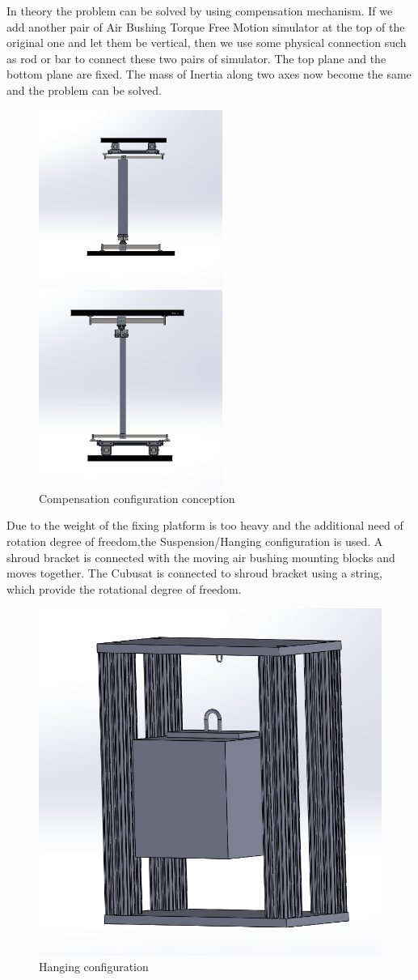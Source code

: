 In theory the problem can be solved by using compensation mechanism. If we add another pair of Air Bushing Torque Free Motion simulator at the top of the original one and let them be vertical, then we use some physical connection such as rod or bar to connect these two pairs of simulator. The top plane and the bottom plane are fixed. The mass of Inertia along two axes now become the same and the problem can be solved. 

\begin{figure}[H]
\centering
\begin{minipage}[t]{0.48\textwidth}
\centering
\includegraphics[width=6cm]{fig/DOE/FrontView}
\end{minipage}
\begin{minipage}[t]{0.48\textwidth}
\centering
\includegraphics[width=6cm]{fig/DOE/RightView}
\end{minipage}
\caption{Compensation configuration conception}
\end{figure}

Due to the weight of the fixing platform is too heavy and the additional need of rotation degree of freedom,the Suspension/Hanging configuration is used. A shroud bracket is connected with the moving air bushing mounting blocks and moves together. The Cubusat is connected to shroud bracket using a string, which provide the rotational degree of freedom. 

\begin{figure}[H]
\centering
\includegraphics[width=0.3\linewidth]{fig/DOE/Hang}
\caption{Hanging configuration} 
\end{figure} 

\newpage
